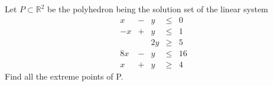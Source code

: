 \documentclass[
  a4paper,
  12pt,
]{article}
\numberwithin{equation}{section}
\begin{document}

\begin{exercise}
  Let $P \subset \mathbb{R}^2$ be the polyhedron being the solution set of the linear system
  \begin{equation}
    \begin{array}{rcrcl}
      x & - & y & \leq & 0 \\
      -x & + & y & \leq & 1 \\
      & & 2y & \geq & 5 \\
      8x & - & y & \leq & 16 \\
      x & + & y & \geq & 4
    \end{array}
  \end{equation}
  Find all the extreme points of P.
\end{exercise}
\end{document}
